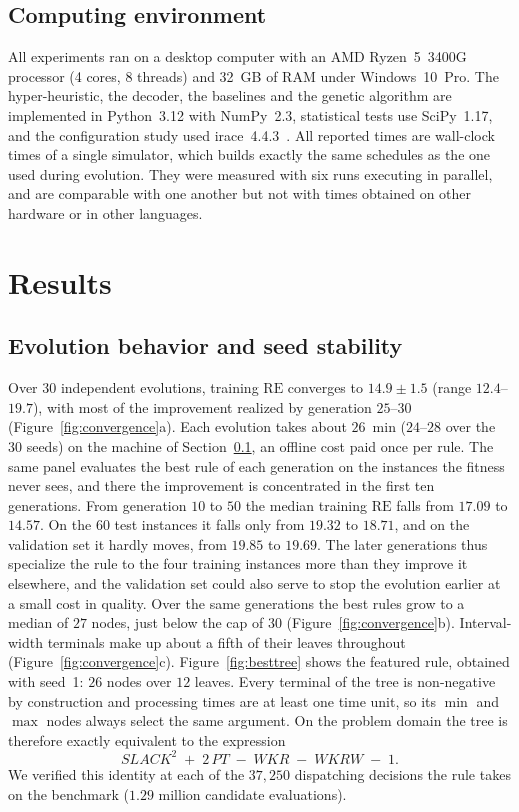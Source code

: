 \documentclass[review,authoryear,11pt]{elsarticle}
\newcommand{\RE}{\mathrm{RE}}
\begin{document}
\subsection{Computing environment}
\label{sec:env}
All experiments ran on a desktop computer with an AMD Ryzen~5~3400G
processor (4 cores, 8 threads) and 32~GB of RAM under Windows~10~Pro.
The hyper-heuristic, the decoder, the baselines and the genetic
algorithm are implemented in Python~3.12 with NumPy~2.3, statistical
tests use SciPy~1.17, and the configuration study used
irace~4.4.3~\citep{LopezIbanez2016}. All reported times are wall-clock times of a single
simulator, which builds exactly the same schedules as the one used
during evolution. They were measured with six runs executing in
parallel, and are comparable with one another but not with times
obtained on other hardware or in other languages.

\section{Results}
\label{sec:results}


\subsection{Evolution behavior and seed stability}
Over 30 independent evolutions, training $\RE$ converges to
$14.9 \pm 1.5$ (range $12.4$--$19.7$), with most of the improvement
realized by generation $25$--$30$ (Figure~\ref{fig:convergence}a).
Each evolution takes about $26$~min ($24$--$28$ over the 30 seeds) on the
machine of Section~\ref{sec:env}, an offline cost paid once per rule.
The same panel evaluates the best rule of each generation on the
instances the fitness never sees, and there the improvement is
concentrated in the first ten generations. From generation $10$ to $50$
the median training $\RE$ falls from $17.09$ to $14.57$. On the $60$
test instances it falls only from $19.32$ to $18.71$, and on the
validation set it hardly moves, from $19.85$ to $19.69$. The later
generations thus specialize the rule to the four training instances more
than they improve it elsewhere, and the validation set could also serve
to stop the evolution earlier at a small cost in quality. Over the same
generations the best rules grow to a median of $27$ nodes, just below
the cap of $30$ (Figure~\ref{fig:convergence}b). Interval-width
terminals make up about a fifth of their leaves throughout
(Figure~\ref{fig:convergence}c).
Figure~\ref{fig:besttree}
shows the featured rule, obtained with seed~1: $26$ nodes
over $12$ leaves. Every terminal of the tree is non-negative by
construction and processing times are at least one time unit, so its
$\min$ and $\max$ nodes always select the same argument. On the
problem domain the tree is therefore exactly equivalent to the
expression
\begin{equation}
\mathit{SLACK}^{2} \;+\; 2\,\mathit{PT}
\;-\; \mathit{WKR} \;-\; \mathit{WKRW} \;-\; 1 .
\label{eq:besttree}
\end{equation}
We verified this identity at each of the $37{,}250$ dispatching decisions
the rule takes on the benchmark ($1.29$ million candidate evaluations).
\end{document}
